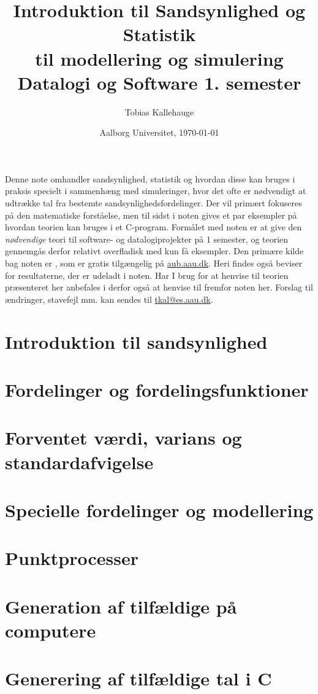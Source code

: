 \documentclass{article}
\title{Introduktion til Sandsynlighed og Statistik \\
til modellering og simulering  \\
\large Datalogi og Software 1. semester}
\date{Aalborg Universitet, \today}
\author{Tobias Kallehauge}
\begin{document}
\maketitle
\newpage
Denne note omhandler sandsynlighed, statistik og hvordan disse kan bruges i praksis specielt i sammenhæng med simuleringer, hvor det ofte er nødvendigt at udtrække tal fra bestemte sandsynlighedsfordelinger. Der vil primært fokuseres på den matematiske forståelse, men til sidst i noten gives et par eksempler på hvordan teorien kan bruges i et C-program. Formålet med noten er at give den \emph{nødvendige} teori til software- og datalogiprojekter på  1 semester, og teorien gennemgås derfor relativt overfladisk med kun få eksempler. Den primære kilde bag noten er \cite{olofsson2012}, som er gratis tilgængelig på \href{aub.aau.dk}{aub.aau.dk}. Heri findes også beviser for resultaterne, der er udeladt i noten. Har I brug for at henvise til teorien præsenteret her anbefales i derfor også at henvise til \cite{olofsson2012} fremfor noten her. Forslag til ændringer, stavefejl mm. kan sendes til \href{mailto:tkal@es.aau.dk}{tkal@es.aau.dk}. 
\section{Introduktion til sandsynlighed}


\section{Fordelinger og fordelingsfunktioner}


\section{Forventet værdi, varians og standardafvigelse}


\section{Specielle fordelinger og modellering} 


\section{Punktprocesser} \label{sec:pointprocess}


\section{Generation af tilfældige på computere}


\section{Generering af tilfældige tal i C}



\printbibliography[heading=bibintoc]
\label{bib:mybiblio}
\end{document}
